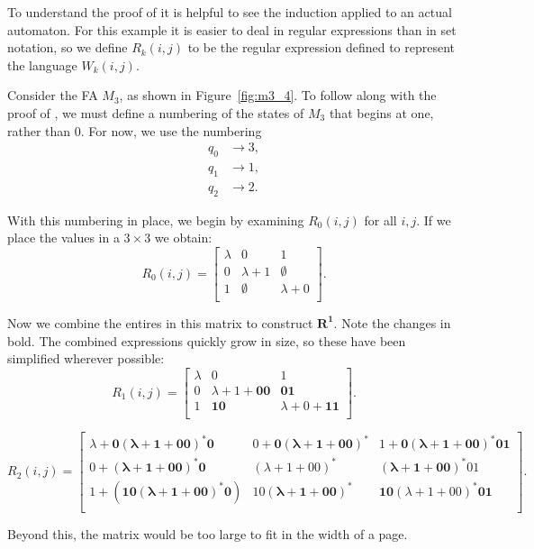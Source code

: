 \documentclass{bcthesis}
\begin{document}
	\begin{example}
		To understand the proof of  it is helpful to see the induction applied to an actual automaton.
		For this example it is easier to deal in regular expressions than in set notation, so we define $R_k(i, j)$ to be the regular expression defined to represent the language $W_k (i, j)$.

		Consider the FA $M_3$, as shown in Figure~\ref{fig:m3_4}.
		To follow along with the proof of , we must define a numbering of the states of $M_3$ that begins at one, rather than 0.
		For now, we use the numbering
		\begin{align*}
			q_0 &\to 3, \\
			q_1 &\to 1, \\
			q_2 &\to 2.
		\end{align*}
		

		With this numbering in place, we begin by examining $R_0(i, j)$ for all $i, j$.
		If we place the values in a $3 \times 3$ we obtain:
		\[
			R_0 (i, j) = 
			\begin{bmatrix}
				\lambda 	& 0				& 1 			\\
				0 			& \lambda + 1 	& \emptyset		\\
				1 			& \emptyset 	& \lambda + 0 	\\
			\end{bmatrix}.
		\]

		Now we combine the entires in this matrix to construct $\mathbf{R^1}$.
		Note the changes in bold. 
		The combined expressions quickly grow in size, so these have been simplified wherever possible:
		\[
			R_1 (i, j) = 
			\begin{bmatrix}
				\lambda 	& 0							& 1 						\\
				0 			& \lambda+1+\bm{00} 	& \bm{01}				\\
				1 			& \bm{10} 				& \lambda+0+\bm{11} 	\\
			\end{bmatrix}.
		\]

		
		\[
			R_2 (i, j) = 
			\begin{bmatrix}
				\lambda + \bm{0(\lambda+1+00)^*0} 	& 0+\bm{0(\lambda+1+00)^*}	& 1+\bm{0(\lambda+1+00)^*01}		\\
				0+\bm{(\lambda+1+00)^*0} 			& (\lambda+1+00)^{\bm{*}} 	& \bm{(\lambda+1+00)^*}01			\\
				1+\bm{(10(\lambda+1+00)^*0)} 		& 10\bm{(\lambda+1+00)^*} 	& \bm{10}(\lambda+1+00)^{\bm{*}}\bm{01} 	\\
			\end{bmatrix}.
		\]

		Beyond this, the matrix would be too large to fit in the width of a page.

	\end{example}
\end{document}

